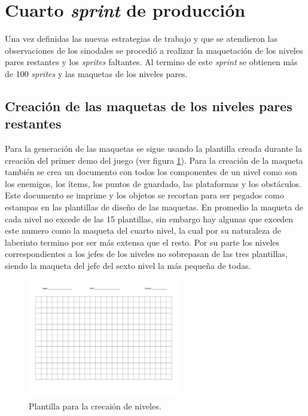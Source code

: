 \section{Cuarto \textit{sprint} de producción}
Una vez definidas las nuevas estrategias de trabajo y que se atendieron 
las observaciones de los sinodales se procedió a realizar la maquetación de los 
niveles pares restantes y los \textit{sprites} faltantes. Al termino de este 
\textit{sprint} se obtienen más de 100 \textit{sprites} y las maquetas de los 
niveles pares.

\subsection{Creación de las maquetas de los niveles pares restantes}
Para la generación de las maquetas se sigue usando la plantilla creada durante 
la creación del primer demo del juego (ver figura \ref{fig:MaquetaPlantilla}). 
Para la creación de la maqueta también se crea un documento con todos los 
componentes de un nivel como son los enemigos, los ítems, los puntos de guardado, 
las plataformas y los obstáculos. Este documento se imprime y los objetos se 
recortan para ser pegados como estampas en las plantillas de diseño de las 
maquetas. En promedio la maqueta de cada nivel no excede de las 15 plantillas, 
sin embargo hay algunas que exceden este numero como la maqueta del cuarto nivel, 
la cual por su naturaleza de laberinto termino por ser más extensa que el 
resto. Por su parte los niveles correspondientes a los jefes de los niveles no 
sobrepasan de las tres plantillas, siendo la maqueta del jefe del sexto nivel 
la más pequeña de todas. 

\begin{figure}[h]
	\centering
	\includegraphics[width=0.6\textwidth]{03TrabajoRealizado/imagenes/maqueta-1.png}
 	\caption{Plantilla para la crecaión de niveles.}
	\label{fig:MaquetaPlantilla}		
\end{figure}

